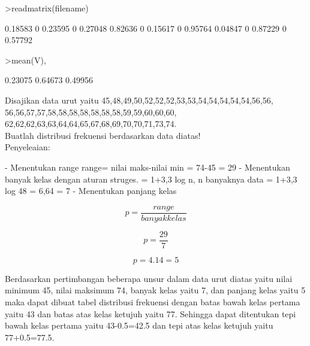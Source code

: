 \documentclass[a4paper,10pt]{article}
\begin{document}
\begin{eulernotebook}
\begin{eulercomment}
\begin{eulercomment}
\begin{eulercomment}
\begin{eulercomment}
\begin{eulercomment}
\begin{eulercomment}
\begin{euleroutput}
\end{euleroutput}
\begin{eulerprompt}
>readmatrix(filename)
\end{eulerprompt}
\begin{euleroutput}
    0.18583         0   0.23595         0   0.27048 
    0.82636         0   0.15617         0   0.95764 
    0.04847         0   0.87229         0   0.57792 
\end{euleroutput}
\begin{eulerprompt}
>mean(V),
\end{eulerprompt}
\begin{euleroutput}
    0.23075 
    0.64673 
    0.49956 
\end{euleroutput}
\begin{eulercomment}
Disajikan data urut yaitu
45,48,49,50,52,52,52,53,53,54,54,54,54,54,56,56,
56,56,57,57,58,58,58,58,58,58,58,59,59,60,60,60,
62,62,62,63,63,64,64,65,67,68,69,70,70,71,73,74.\\
Buatlah distribusi frekuensi berdasarkan data diatas!\\
Penyeleaian:\\
\end{eulercomment}
\begin{eulerttcomment}
         - Menentukan range
           range= nilai maks-nilai min
                = 74-45
                = 29
         - Menentukan banyak kelas dengan aturan
           struges.
           = 1+3,3 log n, n banyaknya data
           = 1+3,3 log 48
           = 6,64
           = 7
         - Menentukan panjang kelas
\end{eulerttcomment}
\begin{eulerformula}
\[
p=\frac {range}{banyak kelas}
\]
\end{eulerformula}
\begin{eulerformula}
\[
p=\frac {29}{7}
\]
\end{eulerformula}
\begin{eulerformula}
\[
p= 4.14=5
\]
\end{eulerformula}
\begin{eulercomment}
Berdasarkan pertimbangan beberapa unsur dalam data urut diatas yaitu
nilai minimum 45, nilai maksimum 74, banyak kelas yaitu 7, dan panjang
kelas yaitu 5 maka dapat dibuat tabel distribusi frekuensi dengan
batas bawah kelas pertama yaitu 43 dan batas atas kelas ketujuh yaitu
77. Sehingga dapat ditentukan tepi bawah kelas pertama yaitu
43-0.5=42.5 dan tepi atas kelas ketujuh yaitu 77+0.5=77.5.

\end{eulercomment}
\end{eulercomment}
\end{eulercomment}
\end{eulercomment}
\end{eulercomment}
\end{eulercomment}
\end{eulercomment}
\end{eulernotebook}
\end{document}
